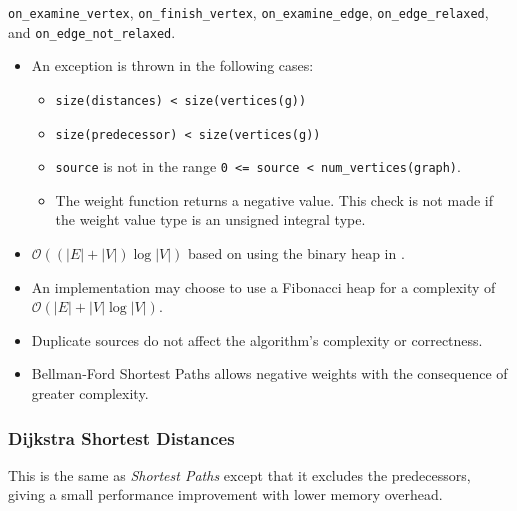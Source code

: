 \begin{itemdescr}
\begin{itemize}
                        \lstinline{on_examine_vertex}, \lstinline{on_finish_vertex}, \lstinline{on_examine_edge},
                        \lstinline{on_edge_relaxed}, and \lstinline{on_edge_not_relaxed}.
            \end{itemize}
      \pnum\throws 
            \begin{itemize}
                  \item An  exception is thrown in the following cases:
                        \begin{itemize}
                              \item \lstinline{size(distances) < size(vertices(g))}
                              \item \lstinline{size(predecessor) < size(vertices(g))}
                              \item \lstinline{source} is not in the range \lstinline{0 <= source < num_vertices(graph)}.
                              \item The weight function returns a negative value. This check is not made if the weight
                                    value type is an unsigned integral type.
                        \end{itemize}
            \end{itemize}
      \pnum\complexity
            \begin{itemize}
                  \item $\mathcal{O}((|E| + |V|)\log{|V|})$ based on using the binary heap in .
                  \item An implementation may choose to use a Fibonacci heap for a complexity of $\mathcal{O}(|E| + |V|\log{|V|})$.
            \end{itemize}
      \pnum\remarks 
            \begin{itemize}
                  \item Duplicate sources do not affect the algorithm's complexity or correctness.
                  \item Bellman-Ford Shortest Paths allows negative weights with the consequence of greater complexity.
            \end{itemize}
\end{itemdescr}

\subsubsection{Dijkstra Shortest Distances}
This is the same as \textit{Shortest Paths} except that it excludes the predecessors,
giving a small performance improvement with lower memory overhead.

